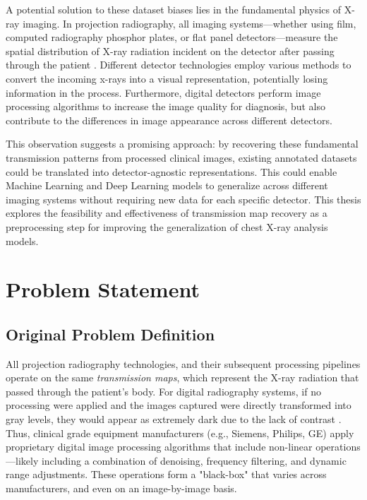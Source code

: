 \documentclass[nomenclature, english, bibtex]{kththesis}
\numberwithin{listing}{chapter}
\begin{document}
A potential solution to these dataset biases lies in the fundamental physics of X-ray imaging.
In projection radiography, all imaging systems—whether using film, computed radiography phosphor plates, or flat panel
detectors—measure the spatial distribution of X-ray radiation incident on the detector after passing through
the patient \cite{Seibert3}. Different detector technologies employ various methods to convert the incoming x-rays
into a visual representation, potentially losing information in the process. Furthermore, digital
detectors perform image processing algorithms to increase the image quality for diagnosis, but also contribute to the
differences in image appearance across different detectors.

This observation suggests a promising approach: by recovering these fundamental transmission patterns from
processed clinical images, existing annotated datasets could be translated into detector-agnostic representations.
This could enable Machine Learning and Deep Learning models to generalize across different imaging systems without
requiring new data for each specific detector. This thesis explores the feasibility and effectiveness of transmission
map recovery as a preprocessing step for improving the generalization of chest X-ray analysis models.

\section{Problem Statement}
\subsection{Original Problem Definition}

All projection radiography technologies, and their subsequent processing pipelines operate on the same
\textit{transmission maps}, which represent the X-ray radiation that passed through the patient's body.
For digital radiography systems, if no processing were applied and the images captured were directly transformed
into gray levels, they would appear as extremely dark due to the lack of contrast \cite[p.~148]{Prokop2003}.
Thus, clinical grade equipment manufacturers (e.g., Siemens, Philips, GE) apply proprietary digital image processing
algorithms that include non-linear operations—likely including a combination of denoising, frequency filtering,
and dynamic range adjustments. These operations form a "black-box" that varies across manufacturers, and even on an
image-by-image basis.
\end{document}
